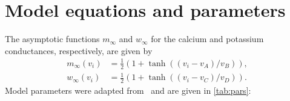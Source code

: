 \documentclass[utf8]{frontiers_suppmat} %
\begin{document}
\onecolumn
{}

\title[Supplementary Material]{{}}


\maketitle

\section{Model equations and parameters}
The asymptotic functions $m_{\infty}$ and $w_{\infty}$ for the calcium and potassium conductances, respectively, are given by
\begin{align}
  m_{\infty}(v_{i}) &= \frac{1}{2}\left(1+\tanh{\left((v_{i}-v_{A})/v_{B}\right)}\right),\\
  w_{\infty}(v_{i}) &= \frac{1}{2}\left(1+\tanh{\left((v_{i}-v_{C})/v_{D}\right)}\right).
\end{align}
Model parameters were adapted from~\cite{bose2011} and are given in \cref{tab:pars}:
\end{document}
